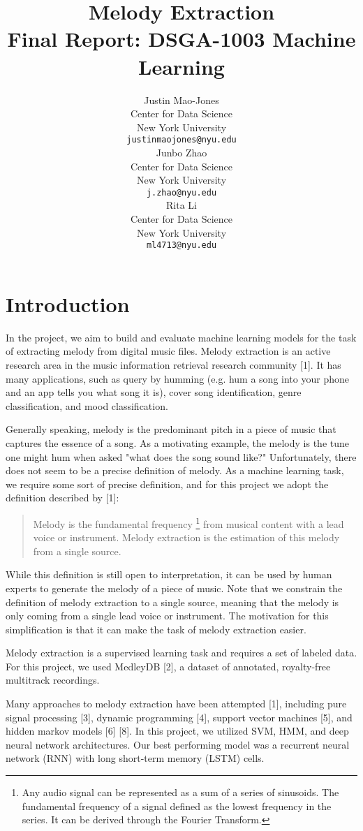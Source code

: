 \documentclass{article} %
\title{Melody Extraction \\ Final Report: DSGA-1003 Machine Learning}
\author{
Justin Mao-Jones \\
Center for Data Science\\
New York University\\
\texttt{justinmaojones@nyu.edu} \\
\And
Junbo Zhao \\
Center for Data Science\\
New York University\\
\texttt{j.zhao@nyu.edu} \\
\AND
Rita Li \\
Center for Data Science\\
New York University\\
\texttt{ml4713@nyu.edu} \\
}
\begin{document}
\maketitle


\section{Introduction}

In the project, we aim to build and evaluate machine learning models for the task of extracting melody from digital music files.  Melody extraction is an active research area in the music information retrieval research community [1].  It has many applications, such as query by humming (e.g. hum a song into your phone and an app tells you what song it is), cover song identification, genre classification, and mood classification.

Generally speaking, melody is the predominant pitch in a piece of music that captures the essence of a song.  As a motivating example, the melody is the tune one might hum when asked "what does the song sound like?"  Unfortunately, there does not seem to be a precise definition of melody.  As a machine learning task, we require some sort of precise definition, and for this project we adopt the definition described by [1]:

\begin{quote}
Melody is the fundamental frequency \footnote{Any audio signal can be represented as a sum of a series of sinusoids.  The fundamental frequency of a signal defined as the lowest frequency in the series.  It can be derived through the Fourier Transform.} from musical content with a lead voice or instrument.  Melody extraction is the estimation of this melody from a single source.
\end{quote}

While this definition is still open to interpretation, it can be used by human experts to generate the melody of a piece of music.  Note that we constrain the definition of melody extraction to a single source, meaning that the melody is only coming from a single lead voice or instrument.  The motivation for this simplification is that it can make the task of melody extraction easier.

Melody extraction is a supervised learning task and requires a set of labeled data.  For this project, we used MedleyDB [2], a dataset of annotated, royalty-free multitrack recordings.

Many approaches to melody extraction have been attempted [1], including pure signal processing [3], dynamic programming [4], support vector machines [5], and hidden markov models [6] [8].  In this project, we utilized SVM, HMM, and deep neural network architectures.  Our best performing model was a recurrent neural network (RNN) with long short-term memory (LSTM) cells.
\end{document}
